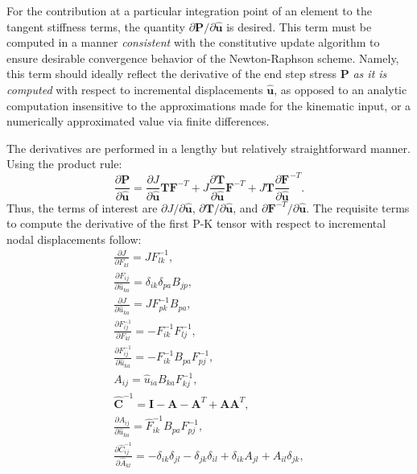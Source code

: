 For the contribution at a particular integration point of an element to the tangent stiffness terms, the quantity $\partial{\bm{P}}/\partial{\hat{\bm{u}}}$ is desired. This term must be computed in a manner \textit{consistent} with the constitutive update algorithm to ensure desirable convergence behavior of the Newton-Raphson scheme. Namely, this term should ideally reflect the derivative of the end step stress $\bm{P}$ \textit{as it is computed} with respect to incremental displacements $\hat{\bm{u}}$, as opposed to an analytic computation insensitive to the approximations made for the kinematic input, or a numerically approximated value via finite differences.

The derivatives are performed in a lengthy but relatively straightforward manner. Using the product rule:
\begin{equation}
\frac{\partial {\bm P}}{\partial \hat{{\bm u}}} = \frac{\partial J}{\partial \hat{\bm u}}{\bm T}{\bm F}^{-T} + J\frac{\partial {\bm T}}{\partial \hat{\bm u}}{\bm F}^{-T} + J{\bm T}\frac{\partial {\bm F}}{\partial \hat{\bm u}}^{-T}.
\end{equation}
Thus, the terms of interest are ${\partial J}/{\partial \hat{\bm{u}}}$, ${\partial \bm{T}}/{\partial \hat{\bm{u}}}$, and ${\partial \bm{F}^{-T}}/{\partial \hat{\bm{u}}}$. The requisite terms to compute the derivative of the first P-K tensor with respect to incremental nodal displacements follow:
\begin{gather}
\frac{\partial J}{\partial F_{kl}} = JF_{lk}^{{-1}}, \\
\frac{\partial F_{ij}}{\partial \hat{u}_{ka}} = \delta_{ik}\delta_{pa}B_{jp}, \\
\frac{\partial J}{\partial \hat{u}_{ka}} = JF_{pk}^{-1}B_{pa}, \\
\frac{\partial F_{ij}^{-1}}{\partial F_{kl}} = - F_{ik}^{-1}F_{lj}^{-1}, \\
\frac{\partial F_{ij}^{-1}}{\partial \hat{u}_{ka}} = - F_{ik}^{-1}B_{pa}F_{pj}^{-1}, \\
A_{ij} = \hat{u}_{ia}B_{ka}F^{-1}_{kj}, \\
\hat{{\bm C}}^{-1} = {\bm I} - {\bm A} - {\bm A}^T + {\bm A}{\bm A}^T, \\
\frac{\partial A_{ij}}{\partial \hat{u}_{ka}} = \hat{F}^{-1}_{ik}B_{pa}F^{-1}_{pj}, \\
\frac{\partial \hat{C}^{-1}_{ij}}{\partial \hat{A}_{kl}} = -\delta_{ik}\delta_{jl} - \delta_{jk}\delta_{il} + \delta_{ik}A_{jl} + A_{il}\delta_{jk},
\end{gather}
